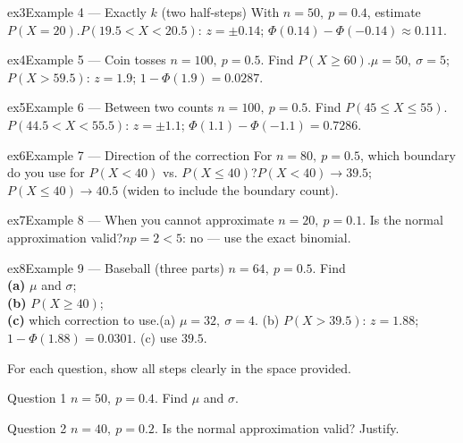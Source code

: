 \documentclass[11pt]{article}
\begin{document}
\begin{example}{ex3}{Example 4 --- Exactly $k$ (two half-steps)}
With $n=50,\ p=0.4$, estimate $P(X=20)$.\soln $P(19.5<X<20.5)$: $z=\pm0.14$; $\Phi(0.14)-\Phi(-0.14)\approx0.111$.
\end{example}

\begin{example}{ex4}{Example 5 --- Coin tosses}
$n=100,\ p=0.5$. Find $P(X\ge60)$.\soln $\mu=50,\ \sigma=5$; $P(X>59.5)$: $z=1.9$; $1-\Phi(1.9)=0.0287$.
\end{example}

\begin{example}{ex5}{Example 6 --- Between two counts}
$n=100,\ p=0.5$. Find $P(45\le X\le55)$.\soln $P(44.5<X<55.5)$: $z=\pm1.1$; $\Phi(1.1)-\Phi(-1.1)=0.7286$.
\end{example}

\begin{example}{ex6}{Example 7 --- Direction of the correction}
For $n=80,\ p=0.5$, which boundary do you use for $P(X<40)$ vs. $P(X\le40)$?\soln $P(X<40)\to39.5$; $P(X\le40)\to40.5$ (widen to include the boundary count).
\end{example}

\begin{example}{ex7}{Example 8 --- When you cannot approximate}
$n=20,\ p=0.1$. Is the normal approximation valid?\soln $np=2<5$: no --- use the exact binomial.
\end{example}

\begin{example}{ex8}{Example 9 --- Baseball (three parts)}
$n=64,\ p=0.5$. Find \\ \textbf{(a)} $\mu$ and $\sigma$; \\ \textbf{(b)} $P(X\ge40)$; \\ \textbf{(c)} which correction to use.\soln (a) $\mu=32,\ \sigma=4$. (b) $P(X>39.5)$: $z=1.88$; $1-\Phi(1.88)=0.0301$. (c) use $39.5$.
\end{example}

\clearpage
{}
For each question, show all steps clearly in the space provided.

\begin{qbox}{Question 1}
$n=50,\ p=0.4$. Find $\mu$ and $\sigma$.\workspace{2.4cm}
\end{qbox}

\begin{qbox}{Question 2}
$n=40,\ p=0.2$. Is the normal approximation valid? Justify.\workspace{2.4cm}
\end{qbox}
\end{document}
